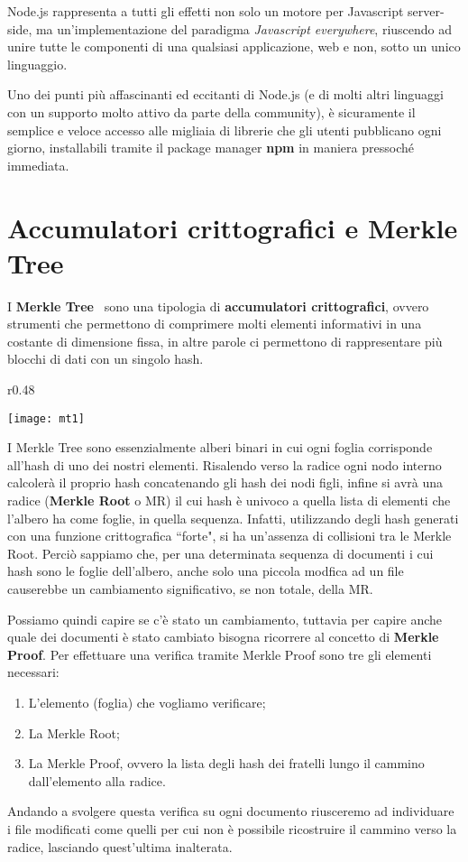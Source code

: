 Node.js rappresenta a tutti gli effetti non solo un motore per Javascript server-side,
ma un'implementazione del paradigma \emph{Javascript everywhere}, riuscendo ad unire
tutte le componenti di una qualsiasi applicazione, web e non, sotto un unico linguaggio.

Uno dei punti più affascinanti ed eccitanti di Node.js (e di molti altri linguaggi
con un supporto molto attivo da parte della community), è sicuramente il semplice e
veloce accesso alle migliaia di librerie che gli utenti pubblicano ogni giorno,
installabili tramite il package manager \textbf{npm} in maniera pressoché immediata.

\newpage

\section{Accumulatori crittografici e Merkle Tree}
\label{sub:mt}
I \textbf{Merkle Tree}~\cite{mertree} sono una tipologia di \textbf{accumulatori crittografici}, ovvero strumenti che permettono
di comprimere molti elementi informativi in una costante di dimensione fissa, in altre parole
ci permettono di rappresentare più blocchi di dati con un singolo hash.
\begin{wrapfigure}{r}{0.48\textwidth}
    \vspace{-20pt}
    \begin{center}
      \texttt{[image: mt1]}
    \end{center}
    \vspace{-20pt}
\end{wrapfigure}
I Merkle Tree sono essenzialmente alberi binari
in cui ogni foglia corrisponde all'hash di uno dei nostri elementi. Risalendo verso la radice ogni
nodo interno calcolerà il proprio hash concatenando gli hash dei nodi figli, infine si avrà
una radice (\textbf{Merkle Root} o MR) il cui hash è univoco a quella lista di elementi che l'albero
ha come foglie, in quella sequenza.
Infatti, utilizzando degli hash generati con una funzione crittografica ``forte", si ha
un'assenza di collisioni tra le Merkle Root.
Perciò sappiamo che, per una determinata sequenza di documenti i cui hash sono le foglie dell'albero, anche solo una
piccola modfica ad un file causerebbe un cambiamento significativo, se non totale, della MR.

Possiamo quindi capire se c'è stato un cambiamento, tuttavia per capire anche
quale dei documenti è stato cambiato bisogna ricorrere al concetto di \textbf{Merkle Proof}.
Per effettuare una verifica tramite Merkle Proof sono tre gli elementi necessari:
\begin{enumerate}
    \item L'elemento (foglia) che vogliamo verificare;
    \item La Merkle Root;
    \item La Merkle Proof, ovvero la lista degli hash dei fratelli lungo il cammino dall'elemento alla radice.
\end{enumerate}
Andando a svolgere questa verifica su ogni documento riusceremo ad individuare i file modificati come
quelli per cui non è possibile ricostruire il cammino verso la radice, lasciando quest'ultima inalterata.

